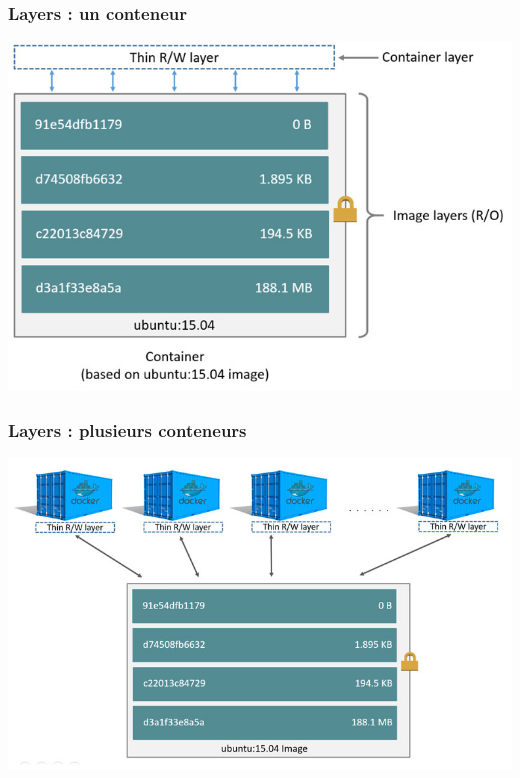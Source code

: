   \begin{frame}
    \frametitle{Layers : un conteneur}
    \begin{itemize}
      \includegraphics[width=\linewidth,height=\textheight]{images/docker/container-layers.jpg}
    \end{itemize}
  \end{frame}

 \begin{frame}
    \frametitle{Layers : plusieurs conteneurs}
    \begin{itemize}
      \includegraphics[width=\linewidth,height=\textheight]{images/docker/sharing-layers.jpg}
    \end{itemize}
  \end{frame}

